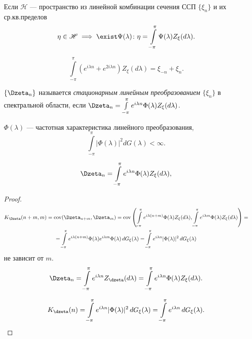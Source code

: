 \begin{theorem}
  Если $ \mathscr{H} $ --- пространство из линейной комбинации сечения ССП $
  \{\xi_n\} $ и их ср.кв.пределов  
  \[
    \eta \in \mathscr{H} \implies \exist \Psi(\lambda)\colon \eta =
    \int\limits_{-\pi}^{\pi}\Psi(\lambda)Z_\xi(d\lambda). 
  \]
\end{theorem}
\begin{remark*}
   
 \[
   \int\limits_{-\pi}^{\pi}(e^{i\lambda n} + e^{2i\lambda n})Z_\xi(d\lambda) =
   \xi_{-n} + \xi_n.
 \]
\end{remark*} 

\begin{definition}
  $ \{\Dzeta_n\} $ называется \emph{стационарным линейным преобразованием} $
  \{\xi_n\} $ в спектральной области, если $ \Dzeta_n =
  \int\limits_{-\pi}^{\pi}e^{i\lambda n}\Phi(\lambda)Z_\xi(d\lambda) $.

  $ \Phi(\lambda) $ --- частотная характеристика линейного преобразования, 
  \[
      \int\limits_{-\pi}^{\pi}|\Phi(\lambda)|^2 dG(\lambda) < \infty.
  \]
\end{definition}

\begin{theorem}

   
 \[
   \Dzeta_n = \int\limits_{-\pi}^{\pi}e^{i\lambda n}\Phi(\lambda)
   Z_\xi(d\lambda),
 \]
 
\end{theorem}
\begin{proof}
  \begin{multline*}
    K_\Dzeta(n+m, m) = \cov(\Dzeta_{n+m}, \Dzeta_m) = \cov \left(
      \int\limits_{-\pi}^{\pi}e^{i\lambda(n+m)}\Phi(\lambda)Z_\xi(d\lambda),
    \int\limits_{-\pi}^{\pi}e^{i\lambda m}\Phi(\lambda) Z_\xi(d\lambda)\right) =
    \\ =
    \int\limits_{-\pi}^{\pi}e^{i\lambda(n+m)} \Phi(\lambda)e^{i\lambda m}
      \Phi(\lambda)\,dG_\xi(\lambda) = \int\limits_{-\pi}^{\pi}e^{i\lambda n}
      |\Phi(\lambda)|^2\,dG_\xi(\lambda)
  \end{multline*}
  не зависит от $ m $. 
  \[
    \Dzeta_n = \int\limits_{-\pi}^{\pi}e^{i\lambda n} Z_\dzeta(d\lambda) =
    \int\limits_{-\pi}^{\pi}e^{i\lambda n}\Phi(\lambda)Z_\xi(d\lambda).
  \]
  
\[
  K_\dzeta(n) = \int\limits_{-\pi}^{\pi}e^{i\lambda n}
  |\Phi(\lambda)|^2\,dG_\xi(\lambda) = \int\limits_{-\pi}^{\pi}e^{i\lambda
  n}\,dG_\xi(\lambda).
\]
\end{proof}

